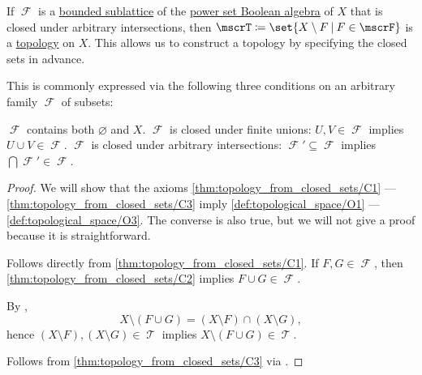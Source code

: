 \begin{proposition}\label{thm:topology_from_closed_sets}
  If \( \mscrF \) is a \hyperref[def:lattice/submodel]{bounded sublattice} of the \hyperref[thm:boolean_algebra_of_subsets]{power set Boolean algebra} of \( X \) that is closed under arbitrary intersections, then \( \mscrT \coloneqq \set{ X \setminus F \given F \in \mscrF } \) is a \hyperref[def:topological_space]{topology} on \( X \). This allows us to construct a topology by specifying the closed sets in advance.

  This is commonly expressed via the following three conditions on an arbitrary family \( \mscrF \) of subsets:
  \begin{thmenum}
     \( \mscrF \) contains both \( \varnothing \) and \( X \).
     \( \mscrF \) is closed under finite unions: \( U, V \in \mscrF \) implies \( U \cup V \in \mscrF \).
     \( \mscrF \) is closed under arbitrary intersections: \( \mscrF' \subseteq \mscrF \) implies \( \bigcap \mscrF' \in \mscrF \).
  \end{thmenum}
\end{proposition}
\begin{proof}
  We will show that the axioms \ref{thm:topology_from_closed_sets/C1} --- \ref{thm:topology_from_closed_sets/C3} imply \ref{def:topological_space/O1} --- \ref{def:topological_space/O3}. The converse is also true, but we will not give a proof because it is straightforward.

   Follows directly from \ref{thm:topology_from_closed_sets/C1}.
   If \( F, G \in \mscrF \), then \ref{thm:topology_from_closed_sets/C2} implies \( F \cup G \in \mscrF \).

  By ,
  \begin{equation*}
    X \setminus (F \cup G) = (X \setminus F) \cap (X \setminus G),
  \end{equation*}
  hence \( (X \setminus F), (X \setminus G) \in \mscrT \) implies \( X \setminus (F \cup G) \in \mscrT \).

   Follows from \ref{thm:topology_from_closed_sets/C3} via .
\end{proof}

